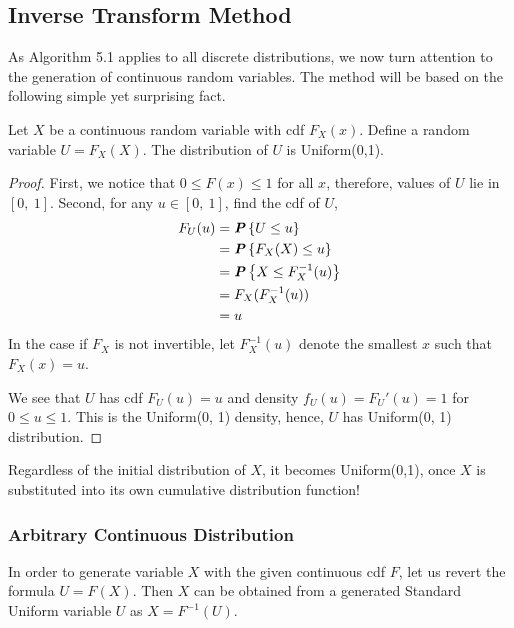 \begin{multicols}{2}
\setlength{\columnsep}{1.5cm}
\setlength{\columnseprule}{0.2pt}

\subsection{Inverse Transform Method}

As Algorithm 5.1 applies to all discrete distributions, we now turn attention to the generation of continuous random variables. The method will be based on the following simple yet surprising fact.
\begin{theorem}{}
  Let $X$ be a continuous random variable with cdf $F_X(x)$. Define a random variable $U = F_X(X)$. The distribution of $U$ is Uniform(0,1).
\end{theorem}
\begin{proof}
  First, we notice that $0 \leq F(x) \leq 1$ for all $x$, therefore, values of $U$ lie in $\left[ 0,\ 1 \right]$. Second, for any $u \in \left[ 0,\ 1 \right]$, find the cdf of $U$,
  \begin{align*}
    F_U(u) &= \textbf{\textit{P}}\left\{U \leq u\right\}\\
           &= \textbf{\textit{P}}\left\{F_X(X) \leq u\right\}\\
           &= \textbf{\textit{P}}\left\{X \leq F_X^{-1}(u)\right\}\\
           &= F_X(F^{-1}_X(u))\\
           &= u
  \end{align*}
  In the case if $F_X$ is not invertible, let $F^{-1}_X(u)$ denote the smallest $x$ such that $F_X(x) = u$.

  We see that $U$ has cdf $F_U(u) = u$ and density $f_U(u) = F_U'(u) = 1$ for $0 \leq u \leq 1$. This is the Uniform(0, 1) density, hence, $U$ has Uniform(0, 1) distribution.
\end{proof}

Regardless of the initial distribution of $X$, it becomes Uniform(0,1), once $X$ is substituted into its own cumulative distribution function!

\subsubsection{Arbitrary Continuous Distribution}

In order to generate variable $X$ with the given continuous cdf $F$, let us revert the formula $U = F(X)$. Then $X$ can be obtained from a generated Standard Uniform variable $U$ as $X = F^{-1}(U)$.


\end{multicols}

